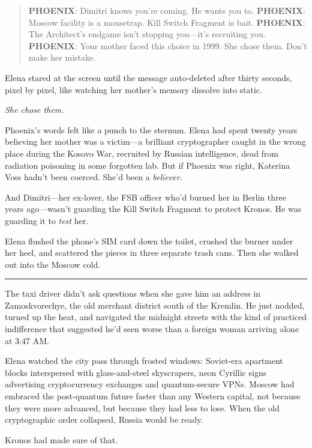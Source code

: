 \begin{quote}
\textbf{PHOENIX}: Dimitri knows you're coming. He wants you to. \textbf{PHOENIX}: Moscow facility is a mousetrap. Kill Switch Fragment is bait. \textbf{PHOENIX}: The Architect's endgame isn't stopping you---it's recruiting you. \textbf{PHOENIX}: Your mother faced this choice in 1999. She chose them. Don't make her mistake.
\end{quote}

Elena stared at the screen until the message auto-deleted after thirty seconds, pixel by pixel, like watching her mother's memory dissolve into static.

\emph{She chose them.}

Phoenix's words felt like a punch to the sternum. Elena had spent twenty years believing her mother was a victim---a brilliant cryptographer caught in the wrong place during the Kosovo War, recruited by Russian intelligence, dead from radiation poisoning in some forgotten lab. But if Phoenix was right, Katerina Voss hadn't been coerced. She'd been a \emph{believer}.

And Dimitri---her ex-lover, the FSB officer who'd burned her in Berlin three years ago---wasn't guarding the Kill Switch Fragment to protect Kronos. He was guarding it to \emph{test} her.

Elena flushed the phone's SIM card down the toilet, crushed the burner under her heel, and scattered the pieces in three separate trash cans. Then she walked out into the Moscow cold.

\begin{center}\rule{0.5\linewidth}{0.5pt}\end{center}

The taxi driver didn't ask questions when she gave him an address in Zamoskvorechye, the old merchant district south of the Kremlin. He just nodded, turned up the heat, and navigated the midnight streets with the kind of practiced indifference that suggested he'd seen worse than a foreign woman arriving alone at 3:47 AM.

Elena watched the city pass through frosted windows: Soviet-era apartment blocks interspersed with glass-and-steel skyscrapers, neon Cyrillic signs advertising cryptocurrency exchanges and quantum-secure VPNs. Moscow had embraced the post-quantum future faster than any Western capital, not because they were more advanced, but because they had less to lose. When the old cryptographic order collapsed, Russia would be ready.

Kronos had made sure of that.

